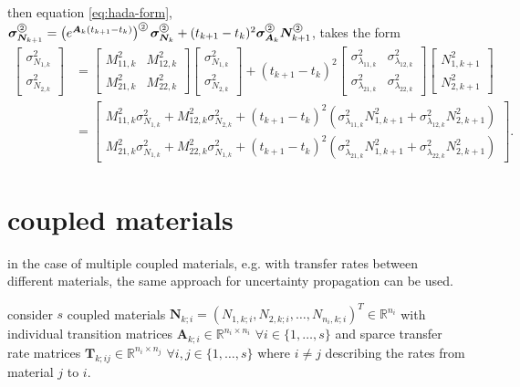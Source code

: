 \documentclass[a4paper]{article}
\newcommand*\Hada{\tikz[baseline=(char.base)]{\node[shape=circle,draw,inner sep=0.7pt] (char) {\tiny{2}};}}
\begin{document}
then equation \ref{eq:hada-form}, $\bm{\sigma}_{\bm{N}_{k+1}}^{\Hada}=\left(e^{\bm{A}_k(t_{k+1}-t_k)}\right)^{\Hada}\bm{\sigma}_{\bm{N}_k}^{\Hada} + (t_{k+1}-t_k)^2 \bm{\sigma}_{\bm{A}_k}^{\Hada}\bm{N}_{k+1}^{\Hada}$, takes the form
\begin{equation}
  \begin{split}
  \begin{bmatrix} \sigma_{N_{1,k}}^2 \\ \sigma_{N_{2,k}}^2 \end{bmatrix}
  &=\begin{bmatrix}
  M_{11,k}^2 & M_{12,k}^2\\
  M_{21,k}^2 & M_{22,k}^2
  \end{bmatrix}
  \begin{bmatrix} \sigma_{N_{1,k}}^2 \\ \sigma_{N_{2,k}}^2 \end{bmatrix}
  + (t_{k+1}-t_k)^2 \begin{bmatrix}
  \sigma_{\lambda_{11,k}}^2 & \sigma_{\lambda_{12,k}}^2\\
  \sigma_{\lambda_{21,k}}^2 & \sigma_{\lambda_{22,k}}^2
  \end{bmatrix}
  \begin{bmatrix} N_{1,k+1}^2 \\ N_{2,k+1}^2 \end{bmatrix} \\
  &=\begin{bmatrix}
  M_{11,k}^2 \sigma_{N_{1,k}}^2 + M_{12,k}^2 \sigma_{N_{2,k}}^2 + (t_{k+1}-t_k)^2 \left( \sigma_{\lambda_{11,k}}^2 N_{1,k+1}^2 + \sigma_{\lambda_{12,k}}^2 N_{2,k+1}^2 \right)  \\
  M_{21,k}^2 \sigma_{N_{1,k}}^2+ M_{22,k}^2 \sigma_{N_{1,k}}^2 + (t_{k+1}-t_k)^2 \left( \sigma_{\lambda_{21,k}}^2 N_{1,k+1}^2 + \sigma_{\lambda_{22,k}}^2 N_{2,k+1}^2 \right)
  \end{bmatrix}.
  \end{split}
\end{equation}


\section*{coupled materials}
in the case of multiple coupled materials, e.g. with transfer rates between different materials, the same approach for uncertainty propagation can be used.

consider $s$ coupled materials $\bm{N}_{k;i}=(N_{1,k;i},N_{2,k;i},\ldots,N_{n_i,k;i})^T\in\mathbb{R}^{n_i}$ with individual transition matrices $\bm{A}_{k;i}\in\mathbb{R}^{n_i\times n_i}$ $\forall i\in\{1,\ldots,s\}$ and sparce transfer rate matrices $\bm{T}_{k;ij}\in\mathbb{R}^{n_i\times n_j}$ $\forall i,j\in\{1,\ldots,s\}$ where $i\neq j$ describing the rates from material $j$ to $i$.
\end{document}
